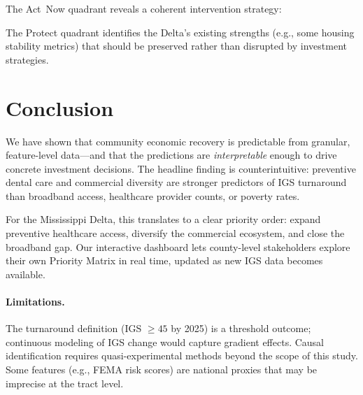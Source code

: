 \documentclass[10pt, letterpaper]{article}
\begin{document}
The Act~Now quadrant reveals a coherent intervention strategy:


The Protect quadrant identifies the Delta's existing strengths
(e.g., some housing stability metrics) that should be preserved
rather than disrupted by investment strategies.

\section{Conclusion}

We have shown that community economic recovery is predictable from
granular, feature-level data—and that the predictions are
\emph{interpretable} enough to drive concrete investment decisions.
The headline finding is counterintuitive: preventive dental care and
commercial diversity are stronger predictors of IGS turnaround than
broadband access, healthcare provider counts, or poverty rates.

For the Mississippi Delta, this translates to a clear priority order:
expand preventive healthcare access, diversify the commercial
ecosystem, and close the broadband gap.  Our interactive dashboard
lets county-level stakeholders explore their own Priority Matrix in
real time, updated as new IGS data becomes available.

\paragraph{Limitations.}  The turnaround definition (IGS $\geq 45$ by
2025) is a threshold outcome; continuous modeling of IGS change would
capture gradient effects.  Causal identification requires quasi-experimental
methods beyond the scope of this study.  Some features (e.g., FEMA
risk scores) are national proxies that may be imprecise at the tract
level.
\end{document}
